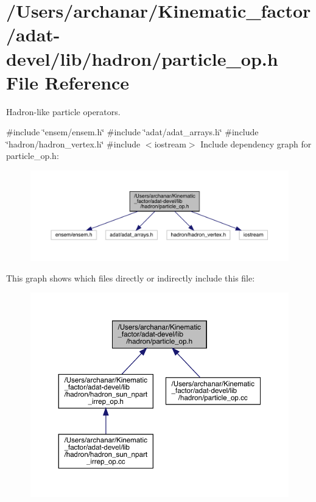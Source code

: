 \hypertarget{adat-devel_2lib_2hadron_2particle__op_8h}{}\section{/\+Users/archanar/\+Kinematic\+\_\+factor/adat-\/devel/lib/hadron/particle\+\_\+op.h File Reference}
\label{adat-devel_2lib_2hadron_2particle__op_8h}


Hadron-\/like particle operators.  


{\ttfamily \#include \char`\"{}ensem/ensem.\+h\char`\"{}}\newline
{\ttfamily \#include \char`\"{}adat/adat\+\_\+arrays.\+h\char`\"{}}\newline
{\ttfamily \#include \char`\"{}hadron/hadron\+\_\+vertex.\+h\char`\"{}}\newline
{\ttfamily \#include $<$iostream$>$}\newline
Include dependency graph for particle\+\_\+op.\+h\+:
\nopagebreak
\begin{figure}[H]
\begin{center}
\leavevmode
\includegraphics[width=350pt]{d3/d4a/adat-devel_2lib_2hadron_2particle__op_8h__incl}
\end{center}
\end{figure}
This graph shows which files directly or indirectly include this file\+:
\nopagebreak
\begin{figure}[H]
\begin{center}
\leavevmode
\includegraphics[width=350pt]{d2/dcd/adat-devel_2lib_2hadron_2particle__op_8h__dep__incl}
\end{center}
\end{figure}
